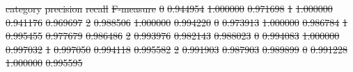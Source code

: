 \documentclass[
10pt, %
a4paper, %
oneside, %
headinclude,footinclude, %
] {book}%
\providecommand{\DIFdel}[1]{{\protect\color{red}\sout{#1}}}                      %
\providecommand{\DIFdelbegin}{} %
\providecommand{\DIFdelFL}[1]{\DIFdel{#1}} %
\begin{document}
\DIFdelbegin %
\DIFdelFL{category }%
\DIFdelFL{precision }%
\DIFdelFL{recall }%
\DIFdelFL{F-measure }%
\DIFdelFL{0 }%
\DIFdelFL{0.944954 }%
\DIFdelFL{1.000000 }%
\DIFdelFL{0.971698 }%
\DIFdelFL{1 }%
\DIFdelFL{1.000000 }%
\DIFdelFL{0.941176 }%
\DIFdelFL{0.969697 }%
\DIFdelFL{2 }%
\DIFdelFL{0.988506 }%
\DIFdelFL{1.000000 }%
\DIFdelFL{0.994220 }%
\DIFdelFL{0 }%
\DIFdelFL{0.973913 }%
\DIFdelFL{1.000000 }%
\DIFdelFL{0.986784 }%
\DIFdelFL{1 }%
\DIFdelFL{0.995455 }%
\DIFdelFL{0.977679 }%
\DIFdelFL{0.986486 }%
\DIFdelFL{2 }%
\DIFdelFL{0.993976 }%
\DIFdelFL{0.982143 }%
\DIFdelFL{0.988023 }%
\DIFdelFL{0 }%
\DIFdelFL{0.994083 }%
\DIFdelFL{1.000000 }%
\DIFdelFL{0.997032 }%
\DIFdelFL{1 }%
\DIFdelFL{0.997050 }%
\DIFdelFL{0.994118 }%
\DIFdelFL{0.995582 }%
\DIFdelFL{2 }%
\DIFdelFL{0.991903 }%
\DIFdelFL{0.987903 }%
\DIFdelFL{0.989899 }%
\DIFdelFL{0 }%
\DIFdelFL{0.991228 }%
\DIFdelFL{1.000000 }%
\DIFdelFL{0.995595 }%
\end{document}
